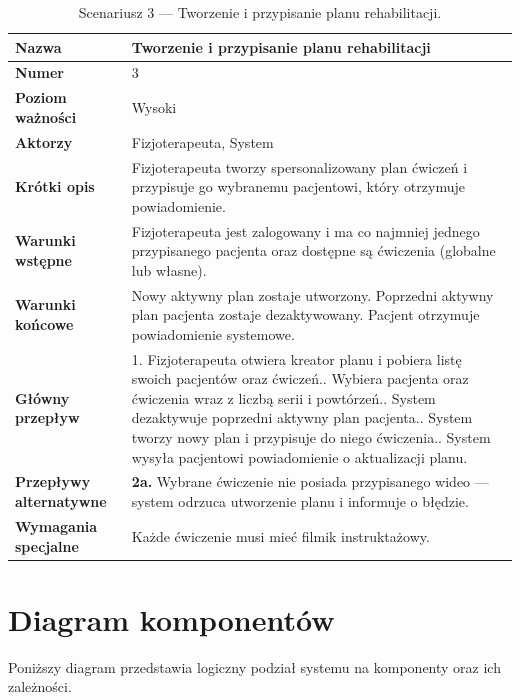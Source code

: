 \documentclass[11pt,a4paper]{article}
\begin{document}
\begin{table}[ht]
\small
\renewcommand{\arraystretch}{1.25}
\begin{tabularx}{\textwidth}{|>{\bfseries}p{}|Y|}
\hline
Nazwa & Tworzenie i przypisanie planu rehabilitacji \\ \hline
Numer & 3 \\ \hline
Poziom ważności & Wysoki \\ \hline
Aktorzy & Fizjoterapeuta, System \\ \hline
Krótki opis & Fizjoterapeuta tworzy spersonalizowany plan ćwiczeń i przypisuje go wybranemu pacjentowi, który otrzymuje powiadomienie. \\ \hline
Warunki wstępne & Fizjoterapeuta jest zalogowany i ma co najmniej jednego przypisanego pacjenta oraz dostępne są ćwiczenia (globalne lub własne). \\ \hline
Warunki końcowe & Nowy aktywny plan zostaje utworzony. Poprzedni aktywny plan pacjenta zostaje dezaktywowany. Pacjent otrzymuje powiadomienie systemowe. \\ \hline
Główny przepływ & 1. Fizjoterapeuta otwiera kreator planu i pobiera listę swoich pacjentów oraz ćwiczeń.. Wybiera pacjenta oraz ćwiczenia wraz z liczbą serii i powtórzeń.. System dezaktywuje poprzedni aktywny plan pacjenta.. System tworzy nowy plan i przypisuje do niego ćwiczenia.. System wysyła pacjentowi powiadomienie o aktualizacji planu. \\ \hline
Przepływy alternatywne & \textbf{2a.} Wybrane ćwiczenie nie posiada przypisanego wideo — system odrzuca utworzenie planu i informuje o błędzie. \\ \hline
Wymagania specjalne & Każde ćwiczenie musi mieć filmik instruktażowy. \\ \hline
\end{tabularx}
\caption{Scenariusz 3 — Tworzenie i przypisanie planu rehabilitacji.}
\end{table}
\FloatBarrier

\FloatBarrier
\section{Diagram komponentów}
Poniższy diagram przedstawia logiczny podział systemu na komponenty oraz ich zależności.
\end{document}

